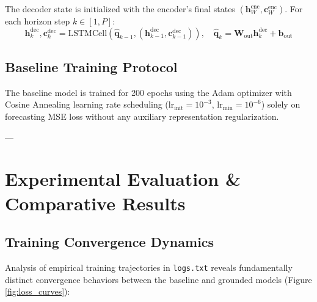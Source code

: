 \documentclass[11pt,a4paper]{article}
\begin{document}
The decoder state is initialized with the encoder's final states $(\mathbf{h}_W^{\text{enc}}, \mathbf{c}_W^{\text{enc}})$. For each horizon step $k \in [1, P]$:
\begin{equation}
    \mathbf{h}_k^{\text{dec}}, \mathbf{c}_k^{\text{dec}} = \text{LSTMCell}(\hat{\mathbf{q}}_{k-1}, (\mathbf{h}_{k-1}^{\text{dec}}, \mathbf{c}_{k-1}^{\text{dec}})), \quad \hat{\mathbf{q}}_k = \mathbf{W}_{\text{out}} \mathbf{h}_k^{\text{dec}} + \mathbf{b}_{\text{out}}
\end{equation}

\subsection{Baseline Training Protocol}
The baseline model is trained for 200 epochs using the Adam optimizer with Cosine Annealing learning rate scheduling ($\text{lr}_{\text{init}} = 10^{-3}$, $\text{lr}_{\text{min}} = 10^{-6}$) solely on forecasting MSE loss without any auxiliary representation regularization.

---

\section{Experimental Evaluation \& Comparative Results}
\label{sec:experiments}

\subsection{Training Convergence Dynamics}
Analysis of empirical training trajectories in \texttt{logs.txt} reveals fundamentally distinct convergence behaviors between the baseline and grounded models (Figure \ref{fig:loss_curves}):
\end{document}

